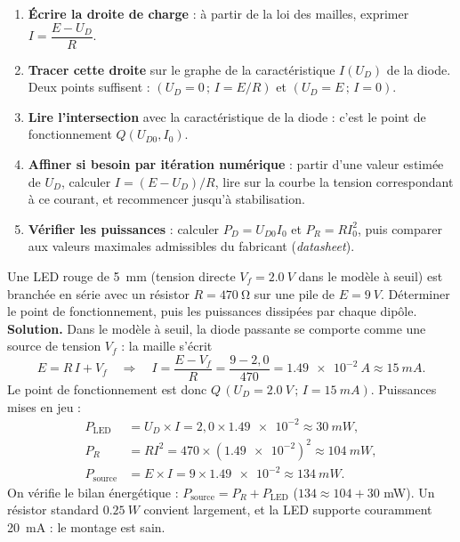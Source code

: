 \documentclass[11pt]{article}
\newcommand{\cle}[1]{{\popxbold\color{popdark}#1}}
\begin{document}
\begin{methode}
\begin{enumerate}
\item \textbf{Écrire la droite de charge} : à partir de la loi des mailles, exprimer $I = \dfrac{E - U_D}{R}$.
\item \textbf{Tracer cette droite} sur le graphe de la caractéristique $I(U_D)$ de la diode. Deux points suffisent : $(U_D = 0\,;\, I = E/R)$ et $(U_D = E\,;\, I = 0)$.
\item \textbf{Lire l'intersection} avec la caractéristique de la diode : c'est le point de fonctionnement $Q(U_{D0}, I_0)$.
\item \textbf{Affiner si besoin par itération numérique} : partir d'une valeur estimée de $U_D$, calculer $I = (E-U_D)/R$, lire sur la courbe la tension correspondant à ce courant, et recommencer jusqu'à stabilisation.
\item \textbf{Vérifier les puissances} : calculer $P_D = U_{D0} I_0$ et $P_R = R I_0^2$, puis comparer aux valeurs maximales admissibles du fabricant (\emph{\cle{datasheet}}).
\end{enumerate}
\end{methode}

\begin{exoresolu}
Une LED rouge de \SI{5}{mm} (tension directe $V_f = \SI{2,0}{V}$ dans le modèle à seuil) est branchée en série avec un résistor $R = \SI{470}{\ohm}$ sur une pile de $E = \SI{9}{V}$. Déterminer le point de fonctionnement, puis les puissances dissipées par chaque dipôle.
\tcblower
\textbf{Solution.} Dans le modèle à seuil, la diode passante se comporte comme une source de tension $V_f$ : la maille s'écrit
\[ E = R\,I + V_f \quad\Longrightarrow\quad I = \frac{E - V_f}{R} = \frac{9 - 2{,}0}{470} = \SI{1,49e-2}{A} \approx \SI{15}{mA}. \]
Le point de fonctionnement est donc $Q\,(U_D = \SI{2,0}{V}\,;\, I = \SI{15}{mA})$. Puissances mises en jeu :
\begin{align*}
P_{\text{LED}} &= U_D \times I = 2{,}0 \times \num{1,49e-2} \approx \SI{30}{mW},\\
P_R &= R I^2 = 470 \times (\num{1,49e-2})^2 \approx \SI{104}{mW},\\
P_{\text{source}} &= E \times I = 9 \times \num{1,49e-2} \approx \SI{134}{mW}.
\end{align*}
On vérifie le bilan énergétique : $P_{\text{source}} = P_R + P_{\text{LED}}$ ($134 \approx 104 + 30$ mW). Un résistor standard $\SI{0,25}{W}$ convient largement, et la LED supporte couramment \SI{20}{mA} : le montage est sain.
\end{exoresolu}
\end{document}
